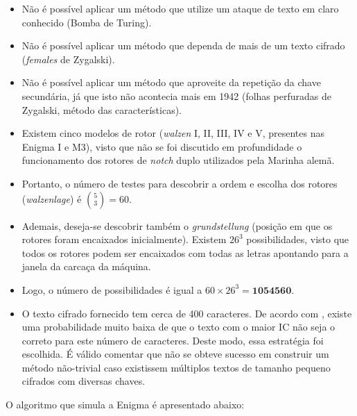 \documentclass{article}
\begin{document}
\begin{itemize}

    \item Não é possível aplicar um método que utilize um ataque de texto em
        claro conhecido (Bomba de Turing).

    \item Não é possível aplicar um método que dependa de mais de um texto
        cifrado (\textit{females} de Zygalski).

    \item Não é possível aplicar um método que aproveite da repetição da chave
        secundária, já que isto não acontecia mais em 1942 (folhas perfuradas
        de Zygalski, método das características).

    \item Existem cinco modelos de rotor (\textit{walzen} I, II, III, IV e V,
        presentes nas Enigma I e M3), visto que não se foi discutido em
        profundidade o funcionamento dos rotores de \textit{notch} duplo
        utilizados pela Marinha alemã.

    \item Portanto, o número de testes para descobrir a ordem e escolha dos
        rotores (\textit{walzenlage}) é $\binom{5}{3} = 60$.

    \item Ademais, deseja-se descobrir também o \textit{grundstellung}
        (posição em que os rotores foram encaixados inicialmente). Existem
        $26^3$ possibilidades, visto que todos os rotores podem ser encaixados
        com todas as letras apontando para a janela da carcaça da máquina.

    \item Logo, o número de possibilidades é igual a
        $60 \times 26^3 = \textbf{1054560}$.

    \item O texto cifrado fornecido tem cerca de 400 caracteres. De acordo com
        \cite{enigmaIC}, existe uma probabilidade muito baixa de que o texto
        com o maior IC não seja o correto para este número de caracteres. Deste
        modo, essa estratégia foi escolhida. É válido comentar que não se
        obteve sucesso em construir um método não-trivial caso existissem
        múltiplos textos de tamanho pequeno cifrados com diversas chaves.

\end{itemize}

O algoritmo que simula a Enigma é apresentado abaixo:
\end{document}
